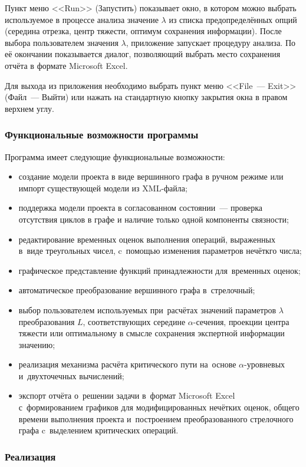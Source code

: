Пункт меню <<Run>> (Запустить) показывает окно, в котором можно выбрать используемое в процессе анализа значение $\lambda$ из списка предопределённых опций (середина отрезка, центр тяжести, оптимум сохранения информации). После выбора пользователем значения $\lambda$, приложение запускает процедуру анализа. По её окончании показывается диалог, позволяющий выбрать место сохранения отчёта в формате Microsoft Excel.

Для выхода из приложения необходимо выбрать пункт меню <<File~--- Exit>> (Файл~--- Выйти) или нажать на стандартную кнопку закрытия окна в правом верхнем углу.

\subsubsection*{Функциональные возможности программы}
Программа имеет следующие функциональные возможности:
\begin{itemize}
  \item создание модели проекта в виде вершинного графа в ручном режиме или импорт существующей модели из XML-файла;
  \item поддержка модели проекта в согласованном состоянии~--- проверка отсутствия циклов в графе и наличие только одной компоненты связности;
  \item редактирование временных оценок выполнения операций, выраженных в~виде треугольных чисел, c~помощью изменения параметров нечёткго числа;
  \item графическое представление функций принадлежности для~временных оценок;
  \item автоматическое преобразование вершинного графа в~стрелочный;
  \item выбор пользователем используемых при~расчётах значений параметров $\lambda$ преобразования $L$, соответствующих середине $\alpha$-сечения, проекции центра тяжести или оптимальному в смысле сохранения экспертной информации значению;
  \item реализация механизма расчёта критического пути на~основе $\alpha$-уровневых и~двухточечных вычислений;
  \item экспорт отчёта о~решении задачи в~формат Microsoft Excel с~формированием графиков для модифицированных нечётких оценок, общего времени выполнения проекта и~построением преобразованного стрелочного графа c~выделением критических операций.
\end{itemize}

\subsubsection*{Реализация}

